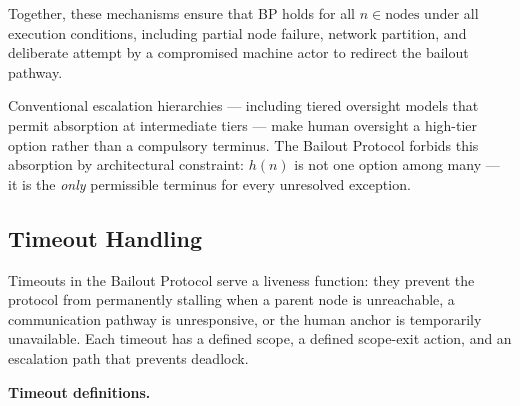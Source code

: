 Together, these mechanisms ensure that BP holds for all $n \in \text{nodes}$ under all execution conditions, including partial node failure, network partition, and deliberate attempt by a compromised machine actor to redirect the bailout pathway.

Conventional escalation hierarchies — including tiered oversight models that permit absorption at intermediate tiers — make human oversight a high-tier option rather than a compulsory terminus. The Bailout Protocol forbids this absorption by architectural constraint: $h(n)$ is not one option among many — it is the \emph{only} permissible terminus for every unresolved exception.

\subsection{Timeout Handling}\label{sec:timeout-handling}

Timeouts in the Bailout Protocol serve a liveness function: they prevent the protocol from permanently stalling when a parent node is unreachable, a communication pathway is unresponsive, or the human anchor is temporarily unavailable. Each timeout has a defined scope, a defined scope-exit action, and an escalation path that prevents deadlock.

\medskip
\noindent\textbf{Timeout definitions.}

